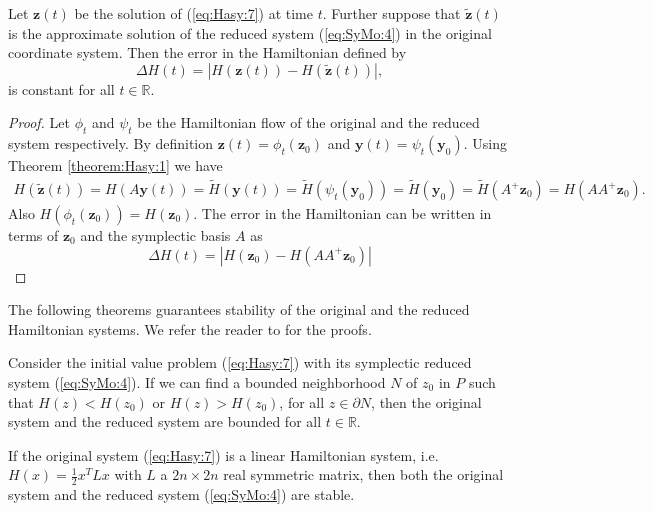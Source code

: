 \begin{proposition}
Let $\mathbf{z} (t)$ be the solution of (\ref{eq:Hasy:7}) at time $t$. Further suppose that $\tilde{\mathbf{z}} (t)$ is the approximate solution of the reduced system (\ref{eq:SyMo:4}) in the original coordinate system. Then the error in the Hamiltonian defined by
\begin{equation} \label{eq:SyMo:5}
	\Delta H(t)  = |H(\mathbf z(t)) - H(\tilde{\mathbf z}(t))|,
\end{equation}
is constant for all $t\in \mathbb R$.
\end{proposition}

\begin{proof}
	Let $\phi_t$ and $\psi_t$ be the Hamiltonian flow of the original and the reduced system respectively. By definition $\mathbf z(t) = \phi_t(\mathbf z_0)$ and $\mathbf y(t) = \psi_t(\mathbf y_0)$. Using Theorem \ref{theorem:Hasy:1} we have
\begin{equation} \label{eq:SyMo:6}
\begin{aligned}
	H(\tilde{\mathbf{z}} (t)) = H( A\mathbf y (t) ) = \tilde H(\mathbf y (t)) = \tilde H(\psi_t(\mathbf y_0)) = \tilde H(\mathbf y_0) = \tilde H(A^+ \mathbf z_0) = H(AA^+\mathbf z_0).
\end{aligned}
\end{equation}
Also $H(\phi_t(\mathbf z_0)) = H(\mathbf z_0)$. The error in the Hamiltonian can be written in terms of $\mathbf z_0$ and the symplectic basis $A$ as
\begin{equation} \label{eq:SyMo:7}
	\Delta H(t) = |H(\mathbf z_0) - H(AA^+\mathbf z_0)|
\end{equation}
\end{proof}

The following theorems guarantees stability of the original and the reduced Hamiltonian systems. We refer the reader to \cite{Peng:2014di} for the proofs. 

\begin{theorem} \label{theorem:SyMo:1}
Consider the initial value problem (\ref{eq:Hasy:7}) with its symplectic reduced system (\ref{eq:SyMo:4}). If we can find a bounded neighborhood $N$ of $z_0$ in $P$ such that $H(z) < H(z_0)$ or $H(z) > H(z_0)$, for all $z\in \partial N$, then the original system and the reduced system are bounded for all $t\in \mathbb R$.
\end{theorem}

\begin{theorem} \label{theorem:SyMo:2}
If the original system (\ref{eq:Hasy:7}) is a linear Hamiltonian system, i.e. $H(x) = \frac 1 2 x^T L x$ with $L$ a $2n\times 2n$ real symmetric matrix, then both the original system and the reduced system (\ref{eq:SyMo:4}) are stable.
\end{theorem}


